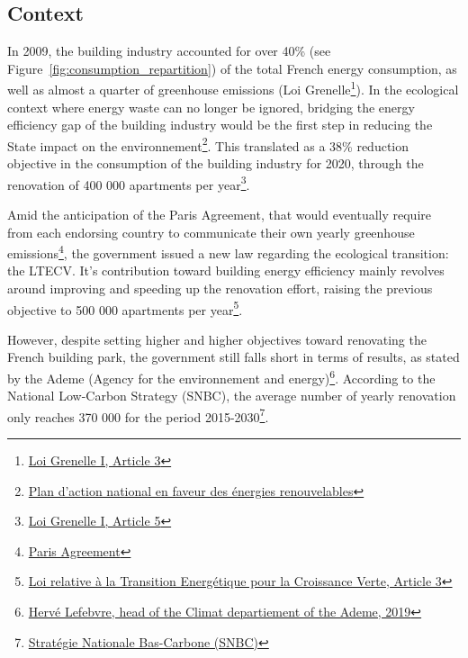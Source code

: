 \documentclass[12pt]{article}
\begin{document}
\subsection{Context}
In 2009, the building industry accounted for over 40\% (see Figure~\ref{fig:consumption_repartition}) of the total French energy consumption, as well as almost a quarter of greenhouse emissions (Loi Grenelle\footnote{\href{https://www.legifrance.gouv.fr/loda/id/JORFTEXT000020949548/2020-09-21/}{Loi Grenelle I, Article 3}}). In the ecological context where energy waste can no longer be ignored, bridging the energy efficiency gap of the building industry would be the first step in reducing the State impact on the environnement\footnote{\href{http://temis.documentation.developpement-durable.gouv.fr/docs/Temis/0067/Temis-0067836/18854.pdf}{Plan d'action national en faveur des énergies renouvelables}}. This translated as a 38\% reduction objective in the consumption of the building industry for 2020, through the renovation of 400 000 apartments per year\footnote{\href{https://www.legifrance.gouv.fr/loda/id/JORFTEXT000020949548/2020-09-21/}{Loi Grenelle I, Article 5}}.

Amid the anticipation of the Paris Agreement, that would eventually require from each endorsing country to communicate their own yearly greenhouse emissions\footnote{\href{https://unfccc.int/files/meetings/paris_nov_2015/application/pdf/paris_agreement_english_.pdf}{Paris Agreement}}, the government issued a new law regarding the ecological transition: the LTECV. It's contribution toward building energy efficiency mainly revolves around improving and speeding up the renovation effort, raising the previous objective to 500 000 apartments per year\footnote{\href{https://www.legifrance.gouv.fr/jorf/id/JORFTEXT000031044385/}{Loi relative à la Transition Energétique pour la Croissance Verte, Article 3}}.

However, despite setting higher and higher objectives toward renovating the French building park, the government still falls short in terms of results, as stated by the Ademe (Agency for the environnement and energy)\footnote{\href{https://www.lefigaro.fr/conjoncture/accord-de-paris-pourquoi-les-pays-ne-sont-pas-a-la-hauteur-de-leurs-engagements-20190419}{Hervé Lefebvre, head of the Climat departiement of the Ademe, 2019}}. According to the National Low-Carbon Strategy (SNBC), the average number of yearly renovation only reaches 370 000 for the period 2015-2030\footnote{\href{https://www.ecologie.gouv.fr/strategie-nationale-bas-carbone-snbc}{Stratégie Nationale Bas-Carbone (SNBC)}}.
\end{document}
